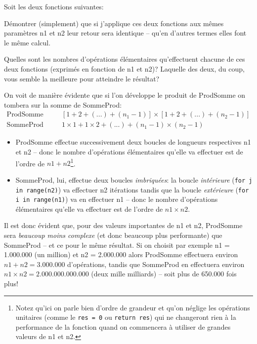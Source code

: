 \documentclass[12pt]{article}
\begin{document}
	\begin{MonExo}
		Soit les deux fonctions suivantes:
		\begin{alphenum}
			\item Démontrer (simplement) que si j'applique ces deux fonctions aux mêmes paramètres n1 et n2 leur retour sera identique -- qu'en d'autres termes elles font le même calcul.
			\item Quelles sont les nombres d'opérations élémentaires qu'effectuent chacune de ces deux fonctions (exprimés en fonction de n1 et n2)? Laquelle des deux, du coup, vous semble la meilleure pour atteindre le résultat?
		\end{alphenum}
		
	\end{MonExo}
	
	\begin{MaReponse}
		\begin{alphenum}
			\item On voit de manière évidente que si l'on développe le produit de ProdSomme on tombera sur la somme de SommeProd:
			\begin{align*}
			\text{ProdSomme renvoie: } & [1 + 2 + (...) + (n_1 - 1)] \times [1 + 2 + (...) + (n_2 - 1)] \\
			\text{SommeProd renvoie: } & 1 \times 1 + 1 \times 2 + (...) + (n_1 - 1) \times (n_2 - 1)
			\end{align*}
			\item
			\begin{itemize}
				\item ProdSomme effectue successivement deux boucles de longueurs respectives n1 et n2 -- donc le nombre d'opérations élémentaires qu'elle va effectuer est de l'ordre de $n1 + n2$\footnote{Notez qu'ici on parle bien d'ordre de grandeur et qu'on néglige les opérations unitaires (comme le \texttt{res = 0} ou \texttt{return res}) qui ne changeront rien à la performance de la fonction quand on commencera à utiliser de grandes valeurs de n1 et n2.\label{Neglig}}.
				\item SommeProd, lui, effectue deux boucles \textit{imbriquées}: la boucle \textit{intérieure} (\texttt{for j in range(n2)}) va effectuer n2 itérations tandis que la boucle \textit{extérieure} (\texttt{for i in range(n1)}) va en effectuer n1 -- donc le nombre d'opérations élémentaires qu'elle va effectuer est de l'ordre de $n1 \times n2$.
			\end{itemize}
			Il est donc évident que, pour des valeurs importantes de n1 et n2, ProdSomme sera \textit{beaucoup moins complexe} (et donc beaucoup plus performante) que SommeProd -- et ce pour le même résultat. Si on choisit par exemple n1 = 1.000.000 (un million) et n2 = 2.000.000 alors ProdSomme effectuera environ $n1 + n2 = 3.000.000$ d'opérations, tandis que SommeProd en effectuera environ $n1 \times n2 = 2.000.000.000.000$ (deux mille milliards) -- soit plus de 650.000 fois plus!
		\end{alphenum}
	\end{MaReponse}
\end{document}
